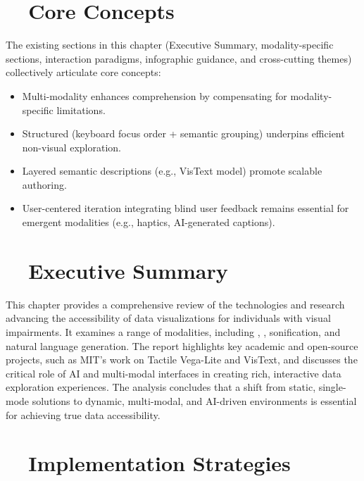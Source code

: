 \section{~~Core Concepts}\label{ch13:sec:core-concepts}
The existing sections in this chapter (Executive Summary, modality-specific sections, interaction paradigms, infographic guidance, and cross-cutting themes) collectively articulate core concepts:
\begin{itemize}
	\item Multi-modality enhances comprehension by compensating for modality-specific limitations.
	\item Structured  (keyboard focus order + semantic grouping) underpins efficient non-visual exploration\supercite{AutoVizuA11y}.
	\item Layered semantic descriptions (e.g., VisText model) promote scalable authoring\supercite{VisText, Lundgard2022Accessible}.
	\item User-centered iteration integrating blind user feedback remains essential for emergent modalities (e.g., haptics, AI-generated captions).
\end{itemize}

\section{~~Executive Summary}\label{ch13:sec:executive-summary}
This chapter provides a comprehensive review of the technologies and research advancing the accessibility of data visualizations for individuals with visual impairments. It examines a range of modalities, including , , sonification, and natural language generation. The report highlights key academic and open-source projects, such as MIT's work on Tactile Vega-Lite and VisText, and discusses the critical role of AI and multi-modal interfaces in creating rich, interactive data exploration experiences. The analysis concludes that a shift from static, single-mode solutions to dynamic, multi-modal, and AI-driven environments is essential for achieving true data accessibility.

\section{~~Implementation Strategies}\label{ch13:sec:implementation-strategies}
